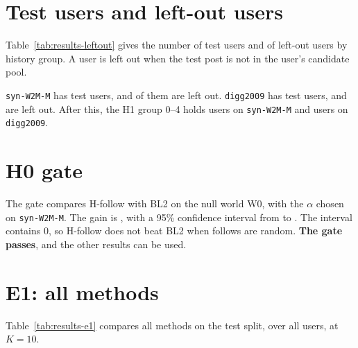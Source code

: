 \section{Test users and left-out users}
\label{sec:results-leftout}

Table~\ref{tab:results-leftout} gives the number of test users and of left-out users by history group. A user is left out when the test post is not in the user's candidate pool.

\begin{table}[htbp]
  \centering
  \caption{Test users and left-out users by history group.}
  \label{tab:results-leftout}
  \small
  
\end{table}

\texttt{syn-W2M-M} has \eOneWTwoMTestUsersAllN{} test users, and \eOneWTwoMLeftOutAllN{} of them are left out. \texttt{digg2009} has \eOneDiggTestUsersAllN{} test users, and \eOneDiggLeftOutAllN{} are left out. After this, the H1 group 0--4 holds \eTwoWTwoMNdcgTenZeroFourN{} users on \texttt{syn-W2M-M} and \eTwoDiggNdcgTenZeroFourN{} users on \texttt{digg2009}.

\section{H0 gate}
\label{sec:results-h0}

The gate compares H-follow with BL2 on the null world W0, with the $\alpha$ chosen on \texttt{syn-W2M-M}. The gain is \hZeroWZeroNdcgHFollowTenAllGain{}, with a 95\% confidence interval from \hZeroWZeroNdcgHFollowTenAllCiLow{} to \hZeroWZeroNdcgHFollowTenAllCiHigh{}. The interval contains 0, so H-follow does not beat BL2 when follows are random. \textbf{The gate passes}, and the other results can be used.

\section{E1: all methods}
\label{sec:results-e1}

Table~\ref{tab:results-e1} compares all methods on the test split, over all users, at $K = 10$.

\begin{table}[htbp]
  \centering
  \caption{E1: all methods on the test split, all users, $K = 10$.}
  \label{tab:results-e1}
  \small
  \resizebox{\textwidth}{!}{\setlength{\tabcolsep}{3pt}}
\end{table}


